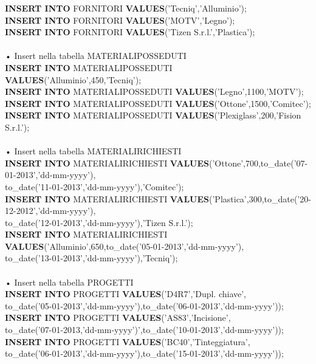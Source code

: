 \documentclass[a4paper,12pt,italian]{article}
\begin{document}
\textbf{INSERT INTO} FORNITORI \textbf{VALUES}('Tecniq','Alluminio'); \\
\textbf{INSERT INTO} FORNITORI \textbf{VALUES}('MOTV','Legno'); \\
\textbf{INSERT INTO} FORNITORI \textbf{VALUES}('Tizen S.r.l.','Plastica'); \\ \\
• Insert nella tabella MATERIALIPOSSEDUTI \\
\textbf{INSERT INTO} MATERIALIPOSSEDUTI \textbf{VALUES}('Alluminio',450,'Tecniq'); \\
\textbf{INSERT INTO} MATERIALIPOSSEDUTI \textbf{VALUES}('Legno',1100,'MOTV'); \\
\textbf{INSERT INTO} MATERIALIPOSSEDUTI \textbf{VALUES}('Ottone',1500,'Comitec'); \\
\textbf{INSERT INTO} MATERIALIPOSSEDUTI \textbf{VALUES}('Plexiglass',200,'Fision S.r.l.'); \\ \\
• Insert nella tabella MATERIALIRICHIESTI \\
\textbf{INSERT INTO} MATERIALIRICHIESTI \textbf{VALUES}('Ottone',700,to\_date('07-01-2013','dd-mm-yyyy'),\\to\_date('11-01-2013','dd-mm-yyyy'),'Comitec'); \\
\textbf{INSERT INTO} MATERIALIRICHIESTI \textbf{VALUES}('Plastica',300,to\_date('20-12-2012','dd-mm-yyyy'),\\to\_date('12-01-2013','dd-mm-yyyy'),'Tizen S.r.l.'); \\
\textbf{INSERT INTO} MATERIALIRICHIESTI \textbf{VALUES}('Alluminio',650,to\_date('05-01-2013','dd-mm-yyyy'),\\to\_date('13-01-2013','dd-mm-yyyy'),'Tecniq'); \\ \\
• Insert nella tabella PROGETTI \\
\textbf{INSERT INTO} PROGETTI \textbf{VALUES}('D4R7','Dupl. chiave',\\to\_date('05-01-2013','dd-mm-yyyy'),to\_date('06-01-2013','dd-mm-yyyy')); \\
\textbf{INSERT INTO} PROGETTI \textbf{VALUES}('AS83','Incisione',\\to\_date('07-01-2013,'dd-mm-yyyy')',to\_date('10-01-2013','dd-mm-yyyy')); \\
\textbf{INSERT INTO} PROGETTI \textbf{VALUES}('BC40','Tinteggiatura',\\to\_date('06-01-2013','dd-mm-yyyy'),to\_date('15-01-2013','dd-mm-yyyy')); \\ \\
\end{document}

